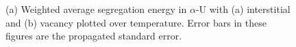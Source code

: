 \documentclass[review]{elsarticle}
\begin{document}
\begin{figure}[h!]
\centering
\caption{(a) Weighted average segregation energy in $\alpha$-U with (a) interstitial and (b) vacancy plotted over temperature. Error bars in these figures are the propagated standard error. }
\label{fig:SE}
\end{figure}
\end{document}
